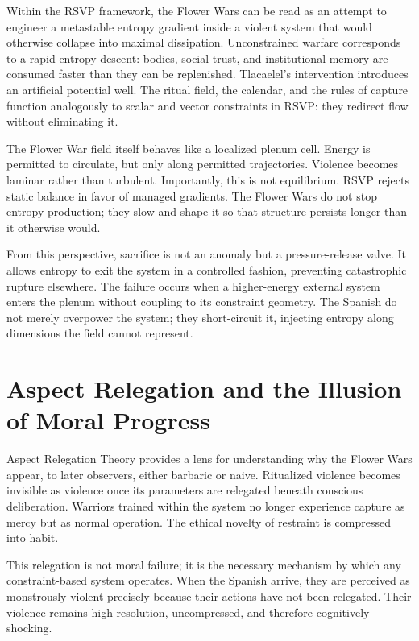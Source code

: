 \documentclass[12pt]{article}
\begin{document}
Within the RSVP framework, the Flower Wars can be read as an attempt to engineer a metastable entropy gradient inside a violent system that would otherwise collapse into maximal dissipation. Unconstrained warfare corresponds to a rapid entropy descent: bodies, social trust, and institutional memory are consumed faster than they can be replenished. Tlacaelel's intervention introduces an artificial potential well. The ritual field, the calendar, and the rules of capture function analogously to scalar and vector constraints in RSVP: they redirect flow without eliminating it.

The Flower War field itself behaves like a localized plenum cell. Energy is permitted to circulate, but only along permitted trajectories. Violence becomes laminar rather than turbulent. Importantly, this is not equilibrium. RSVP rejects static balance in favor of managed gradients. The Flower Wars do not stop entropy production; they slow and shape it so that structure persists longer than it otherwise would.

From this perspective, sacrifice is not an anomaly but a pressure-release valve. It allows entropy to exit the system in a controlled fashion, preventing catastrophic rupture elsewhere. The failure occurs when a higher-energy external system enters the plenum without coupling to its constraint geometry. The Spanish do not merely overpower the system; they short-circuit it, injecting entropy along dimensions the field cannot represent.

\section*{Aspect Relegation and the Illusion of Moral Progress}

Aspect Relegation Theory provides a lens for understanding why the Flower Wars appear, to later observers, either barbaric or naive. Ritualized violence becomes invisible as violence once its parameters are relegated beneath conscious deliberation. Warriors trained within the system no longer experience capture as mercy but as normal operation. The ethical novelty of restraint is compressed into habit.

This relegation is not moral failure; it is the necessary mechanism by which any constraint-based system operates. When the Spanish arrive, they are perceived as monstrously violent precisely because their actions have not been relegated. Their violence remains high-resolution, uncompressed, and therefore cognitively shocking.
\end{document}
